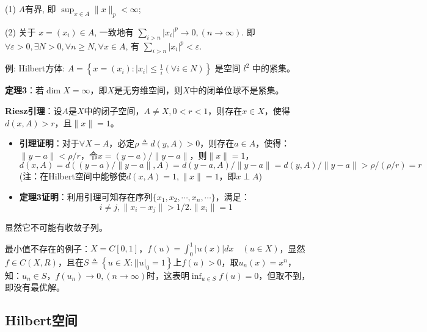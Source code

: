 \documentclass[12pt,a4paper]{article}
\begin{document}
(1) $A$有界, 即 $\sup _{x \in A}\|x\|_{p}<\infty$;

(2) 关于 $x=\left(x_{i}\right) \in A$, 一致地有 $\sum_{i>n}\left|x_{i}\right|^{p} \rightarrow 0,(n \rightarrow \infty)$. 即 $\forall \varepsilon>0, \exists N>0, \forall n \geq N, \forall x \in A$, 有 $\sum_{i>n}\left|x_{i}\right|^{p}<\varepsilon$.

例: Hilbert方体: $A=\left\{x=\left(x_{i}\right):\left|x_{i}\right| \leq \frac{1}{i}(\forall i \in N)\right\}$ 是空间 $l^{2}$ 中的紧集。

\textbf{定理3}：若$\dim X=\infty$，即$X$是无穷维空间，则$X$中的闭单位球不是紧集。

\textbf{Riesz引理}：设$A$是$X$中的闭子空间，$A\neq X,0<r<1$，则存在$x\in X$，使得$d(x,A)>r$，且$\|x\|=1$。

\begin{itemize}
	\item []
	\textbf{引理证明}：对于$\forall X-A$，必定$\rho\triangleq d(y,A)>0$，则存在$a\in A$，使得：$\|y-a\|<\rho/r$，令$x=(y-a)/\|y-a\|$，则$\|x\|=1$，$d(x,A)=d((y-a)/\|y-a\|,A)=d(y-a,A)/\|y-a\|=d(y,A)/\|y-a\|>\rho/(\rho/r)=r$(注：在Hilbert空间中能够使$d(x,A)=1,\|x\|=1$，即$x\perp A$)
\end{itemize}

\begin{itemize}
	\item []
	\textbf{定理3证明}：利用引理可知存在序列$\{x_1,x_2,\cdots,x_n,\cdots\}$，满足：
	\begin{equation}
		i\neq j,\|x_i-x_j\|>1/2. \|x_i\|=1
	\end{equation}
\end{itemize}
显然它不可能有收敛子列。

最小值不存在的例子：$X=C[0,1]$，$f(u)=\int_{0}^{1}|u(x)| d x \quad(u \in X)$，显然$f\in C(X,R)$，且在$S \triangleq\left\{u \in X:\left.|| u\right|_{0}=1\right\}$上$f(u)>0$，取$u_n(x)=x^n$，知：$u_n\in S，f(u_n)\rightarrow 0,(n\rightarrow \infty)$时，这表明$\inf_{u\in S}f(u)=0$，但取不到，即没有最优解。

\subsection{Hilbert空间}
\end{document}
